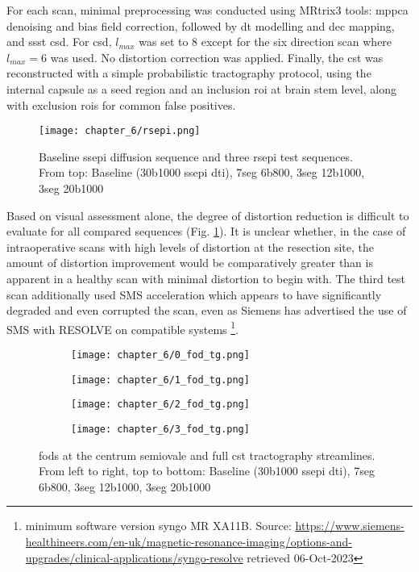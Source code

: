 For each scan, minimal preprocessing was conducted using MRtrix3\autocite{Tournier2019} tools:
\Gls{mppca} denoising and bias field correction, followed by \gls{dt} modelling and \gls{dec} mapping, and \gls{ssst} \gls{csd}.
For \gls{csd}, $l_{max}$ was set to 8 except for the six direction scan where $l_{max}=6$ was used.
No distortion correction was applied.
Finally, the \gls{cst} was reconstructed with a simple probabilistic tractography protocol, using the internal capsule as a seed region and an inclusion \gls{roi} at brain stem level, along with exclusion \glspl{roi} for common false positives.

\begin{figure}[h!]
  \centering
  \texttt{[image: chapter\_6/rsepi.png]}
  \caption[RS-EPI test scan results]{Baseline \gls{ssepi} diffusion sequence and three \gls{rsepi} test sequences. From top: Baseline (30\x b1000 \gls{ssepi} \gls{dti}), 7seg 6\x b800, 3seg 12\x b1000, 3seg 20\x b1000}
  \label{fig:rsepi}
\end{figure}

Based on visual assessment alone, the degree of distortion reduction is difficult to evaluate for all compared sequences (Fig. \ref{fig:rsepi}).
It is unclear whether, in the case of intraoperative scans with high levels of distortion at the resection site, the amount of distortion improvement would be comparatively greater than is apparent in a healthy scan with minimal distortion to begin with.
The third test scan additionally used SMS acceleration which appears to have significantly degraded and even corrupted the scan, even as Siemens has advertised the use of SMS with RESOLVE on compatible systems
\footnote[2]{minimum software version syngo MR XA11B. Source: \url{https://www.siemens-healthineers.com/en-uk/magnetic-resonance-imaging/options-and-upgrades/clinical-applications/syngo-resolve} retrieved 06-Oct-2023}.


\begin{figure}[h!]
  \centering
  \begin{subfigure}{0.5\textwidth}
    \texttt{[image: chapter\_6/0\_fod\_tg.png]}
  \end{subfigure}%
  \begin{subfigure}{0.5\textwidth}
    \texttt{[image: chapter\_6/1\_fod\_tg.png]}
  \end{subfigure}
  \begin{subfigure}{0.5\textwidth}
    \texttt{[image: chapter\_6/2\_fod\_tg.png]}
  \end{subfigure}%
  \begin{subfigure}{0.5\textwidth}
    \texttt{[image: chapter\_6/3\_fod\_tg.png]}
  \end{subfigure}
  \caption[RS-EPI test scan fibre orientation and CST reconstructions]{\Glspl{fod} at the centrum semiovale and full \gls{cst} tractography streamlines. From left to right, top to bottom: Baseline (30\x{}b1000 \gls{ssepi} \gls{dti}), 7seg 6\x{}b800, 3seg 12\x{}b1000, 3seg 20\x{}b1000}
  \label{fig:rsepi-fod}
\end{figure}

